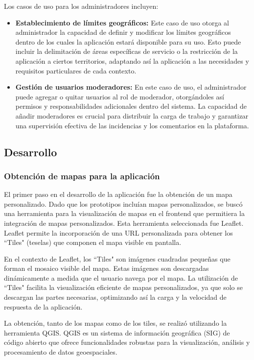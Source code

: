 \documentclass{article}
\begin{document}
Los casos de uso para los administradores incluyen:
\begin{itemize}
    \item \textbf{Establecimiento de límites geográficos:} Este caso de uso otorga al administrador la capacidad de definir y modificar los límites geográficos dentro de los cuales la aplicación estará disponible para su uso. Esto puede incluir la delimitación de áreas específicas de servicio o la restricción de la aplicación a ciertos territorios, adaptando así la aplicación a las necesidades y requisitos particulares de cada contexto.
    \item \textbf{Gestión de usuarios moderadores:} En este caso de uso, el administrador puede agregar o quitar usuarios al rol de moderador, otorgándoles así permisos y responsabilidades adicionales dentro del sistema. La capacidad de añadir moderadores es crucial para distribuir la carga de trabajo y garantizar una supervisión efectiva de las incidencias y los comentarios en la plataforma.
\end{itemize}

\subsection{Desarrollo}

\subsubsection{Obtención de mapas para la aplicación}

El primer paso en el desarrollo de la aplicación fue la obtención de un mapa personalizado. Dado que los prototipos incluían mapas personalizados, se buscó una herramienta para la visualización de mapas en el frontend que permitiera la integración de mapas personalizados. Esta herramienta seleccionada fue Leaflet. Leaflet permite la incorporación de una URL personalizada para obtener los ``Tiles" (teselas) que componen el mapa visible en pantalla.

En el contexto de Leaflet, los ``Tiles" son imágenes cuadradas pequeñas que forman el mosaico visible del mapa. Estas imágenes son descargadas dinámicamente a medida que el usuario navega por el mapa. La utilización de ``Tiles" facilita la visualización eficiente de mapas personalizados, ya que solo se descargan las partes necesarias, optimizando así la carga y la velocidad de respuesta de la aplicación. 

La obtención, tanto de los mapas como de los tiles, se realizó utilizando la herramienta QGIS. QGIS es un sistema de información geográfica (SIG) de código abierto que ofrece funcionalidades robustas para la visualización, análisis y procesamiento de datos geoespaciales.
\end{document}
